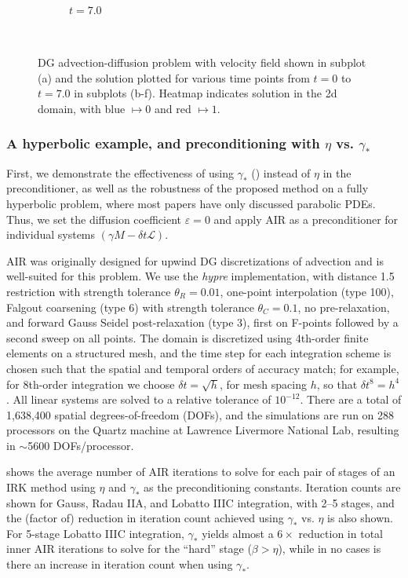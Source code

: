\documentclass[review]{siamart}
\begin{document}
\begin{figure}[!htb]
\begin{subfigure}[b]{0.3\textwidth}
    \caption{$t = 7.0$}
  \end{subfigure}
  \\\vspace{2ex}
      \caption{DG advection-diffusion problem with velocity field shown in
      subplot (a) and the solution plotted for various time points from
      $t=0$ to $t = 7.0$ in subplots (b-f). Heatmap indicates solution in the
      2d domain, with blue $\mapsto 0$ and red $\mapsto 1$.}
  \label{fig:ad_advdiff}
\end{figure}

\subsubsection{A hyperbolic example, and preconditioning with $\eta$ vs. $\gamma_*$}
\label{sec:numerics:dg:const}

First, we demonstrate the effectiveness of using $\gamma_*$ ()
instead of $\eta$ in the preconditioner, as well as the robustness of the proposed
method on a fully hyperbolic problem, where most papers have only discussed parabolic
PDEs. Thus, we set the diffusion coefficient $\varepsilon = 0$
and apply AIR as a preconditioner for individual systems
$(\gamma M - \delta t\mathcal{L})$.

AIR was originally designed for upwind DG discretizations of advection
and is well-suited for this problem. We use the \textit{hypre} implementation,
with distance 1.5 restriction with strength tolerance $\theta_R=0.01$, one-point
interpolation (type 100), Falgout coarsening (type 6) with strength tolerance
$\theta_C=0.1$, no pre-relaxation, and forward Gauss Seidel
post-relaxation (type 3), first on F-points followed by a second sweep on
all points. The domain is discretized using 4th-order finite elements on a
structured mesh, and the time step for each integration scheme is chosen
such that the spatial and temporal orders of accuracy match; for example,
for 8th-order integration we choose $\delta t = \sqrt{h}$, for mesh spacing
$h$, so that $\delta t^8 = h^4$. All linear systems are solved to a relative
tolerance of $10^{-12}$. There are a total of 1,638,400 spatial degrees-of-freedom
(DOFs), and the simulations are run on 288 processors on the Quartz machine at
Lawrence Livermore National Lab, resulting in $\sim$5600 DOFs/processor.

 shows the average number of AIR iterations to solve for
each pair of stages of an IRK method using $\eta$ and $\gamma_*$ as the preconditioning
constants. Iteration counts are shown for Gauss, Radau IIA, and Lobatto IIIC integration,
with 2--5 stages, and the (factor of) reduction in iteration count achieved using $\gamma_*$
vs. $\eta$ is also shown. For 5-stage Lobatto IIIC integration, $\gamma_*$ yields
almost a $6\times$ reduction in total inner AIR iterations to solve for the
``hard'' stage ($\beta > \eta$), while in no cases is there an increase in
iteration count when using $\gamma_*$.
\end{document}
